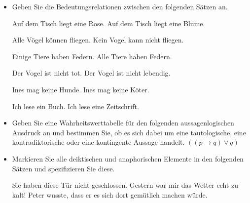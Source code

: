 \begin{frame}

\begin{itemize}
	\item Geben Sie die Bedeutungsrelationen zwischen den folgenden Sätzen an.
	
	\eal 
	\ex Auf dem Tisch liegt eine Rose.
	\ex Auf dem Tisch liegt eine Blume.
	\zl
	
	\eal 
	\ex Alle Vögel können fliegen.
	\ex Kein Vogel kann nicht fliegen.
	\zl
	
	\eal 
	\ex Einige Tiere haben Federn.
	\ex Alle Tiere haben Federn.
	\zl
	
	\eal 
	\ex Der Vogel ist nicht tot.
	\ex Der Vogel ist nicht lebendig.
	\zl
	
	\eal 
	\ex Ines mag keine Hunde.
	\ex Ines mag keine Köter.
	\zl
	
	\eal 
	\ex Ich lese ein Buch.
	\ex Ich lese eine Zeitschrift.
	\zl
	
\end{itemize}

\end{frame}


\begin{frame}

\begin{itemize}
	
	\item Geben Sie eine Wahrheitswerttabelle für den folgenden aussagenlogischen Ausdruck an und bestimmen Sie, ob es sich dabei um eine tautologische, eine kontradiktorische oder eine kontingente Aussage handelt.
	\ea $((p \rightarrow q) \lor q)$
	\z 
	
	\item Markieren Sie alle deiktischen und anaphorischen Elemente in den folgenden Sätzen und spezifizieren Sie diese.
	
	\eal
	\ex Sie haben diese Tür nicht geschlossen.
	\ex Gestern war mir das Wetter echt zu kalt!
	\ex Peter wusste, dass er es sich dort gemütlich machen würde. 
	\zl
	
\end{itemize}

\end{frame}


